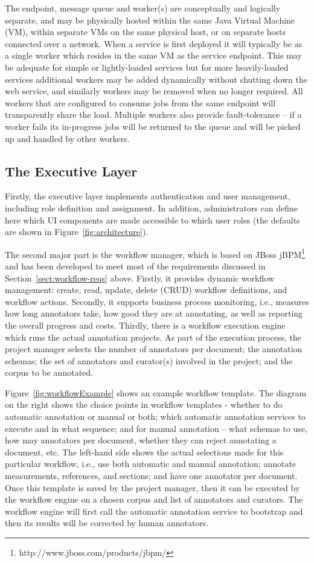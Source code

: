 The endpoint, message queue and worker(s) are conceptually and logically separate, and may be physically hosted within the same Java Virtual Machine (VM), within separate VMs on the same physical host, or on separate hosts connected over a network.  When a service is first deployed it will typically be as a single worker which resides in the same VM as the service endpoint.  This may be adequate for simple or lightly-loaded services but for more heavily-loaded services additional workers may be added dynamically without shutting down the web service, and similarly workers may be removed when no longer required.  All workers that are configured to consume jobs from the same endpoint will transparently share the load.  Multiple workers also provide fault-tolerance -- if a worker fails its in-progress jobs will be returned to the queue and will be picked up and handled by other workers.  

\subsection{The Executive Layer}\label{sect:executive}

Firstly, the executive layer implements authentication and user management, including role definition and assignment. In addition, administrators can define here which UI components are made accessible to which user roles (the defaults are shown in Figure~\ref{fig:architecture}). 

The second major part is the workflow manager, which is based on JBoss jBPM\footnote{http://www.jboss.com/products/jbpm/} and has been developed to meet most of the requirements discussed in Section~\ref{sect:workflow-reqs} above. Firstly, it provides dynamic workflow management: create, read, update, delete (CRUD) workflow definitions, and workflow actions. Secondly, it supports business process monitoring, i.e., measures how long annotators take, how good they are at annotating, as well as reporting the overall progress and costs. Thirdly, there is a workflow execution engine which runs the actual annotation projects. As part of the execution process, the project manager selects the number of annotators per document; the annotation schemas; the set of annotators and curator(s) involved in the project; and the corpus to be annotated. 

Figure~\ref{fig:workflowExample} shows an example workflow template. The diagram on the right shows the choice points in workflow templates - whether to do automatic annotation or manual or both; which automatic annotation services to execute and in what sequence; and for manual annotation -- what schemas to use, how may annotators per document, whether they can reject annotating a document, etc. The left-hand side shows the actual selections made for this particular workflow, i.e., use both automatic and manual annotation; annotate measurements, references, and sections; and have one annotator per document. Once this template is saved by the project manager, then it can be executed by the workflow engine on a chosen corpus and list of annotators and curators. The workflow engine will first call the automatic annotation service to bootstrap and then its results will be corrected by human annotators. 

